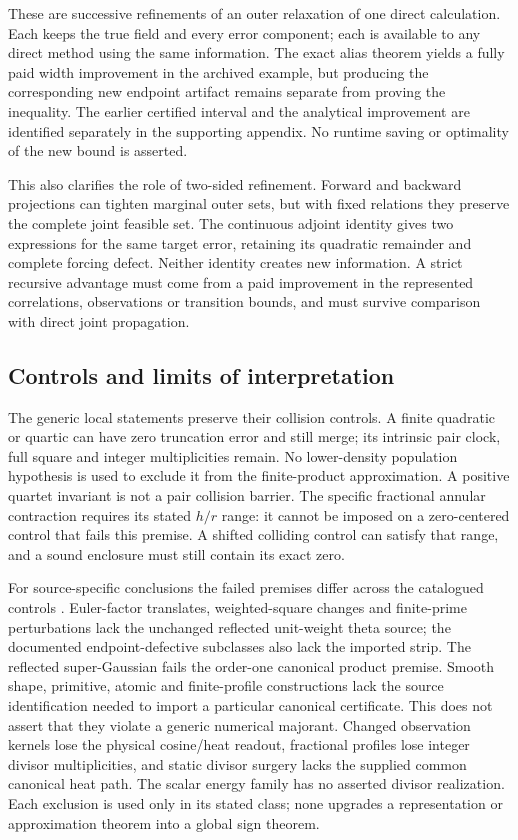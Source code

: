 These are successive refinements of an outer relaxation of one direct
calculation. Each keeps the true field and every error component; each
is available to any direct method using the same information. The exact
alias theorem yields a fully paid width improvement in the archived
example, but producing the corresponding new endpoint artifact remains
separate from proving the inequality. The earlier certified interval and
the analytical improvement are identified separately in the supporting
appendix. No runtime saving or optimality of the new bound is asserted.

This also clarifies the role of two-sided refinement. Forward and backward
projections can tighten marginal outer sets, but with fixed relations
they preserve the complete joint feasible set. The continuous adjoint
identity gives two expressions for the same target error, retaining its
quadratic remainder and complete forcing defect. Neither identity creates
new information. A strict recursive advantage must come from a paid
improvement in the represented correlations, observations or transition
bounds, and must survive comparison with direct joint propagation.

\subsection{Controls and limits of interpretation}

The generic local statements preserve their collision controls. A finite
quadratic or quartic can have zero truncation error and still merge;
its intrinsic pair clock, full square and integer multiplicities remain.
No lower-density population hypothesis is used to exclude it from the
finite-product approximation. A positive quartet invariant is not a pair
collision barrier. The specific fractional annular contraction requires
its stated $h/r$ range: it cannot be imposed on a zero-centered control
that fails this premise. A shifted colliding control can satisfy that
range, and a sound enclosure must still contain its exact zero.

For source-specific conclusions the failed premises differ across the
catalogued controls \cite{BakerControls}. Euler-factor translates,
weighted-square changes and finite-prime perturbations lack the unchanged
reflected unit-weight theta source; the documented endpoint-defective
subclasses also lack the imported strip. The reflected super-Gaussian
fails the order-one canonical product premise. Smooth shape, primitive,
atomic and finite-profile constructions lack the source identification
needed to import a particular canonical certificate. This does not assert
that they violate a generic numerical majorant. Changed observation
kernels lose the physical cosine/heat readout, fractional profiles lose
integer divisor multiplicities, and static divisor surgery lacks the
supplied common canonical heat path. The scalar energy family has no
asserted divisor realization. Each exclusion is used only in its stated
class; none upgrades a representation or approximation theorem into a
global sign theorem.


